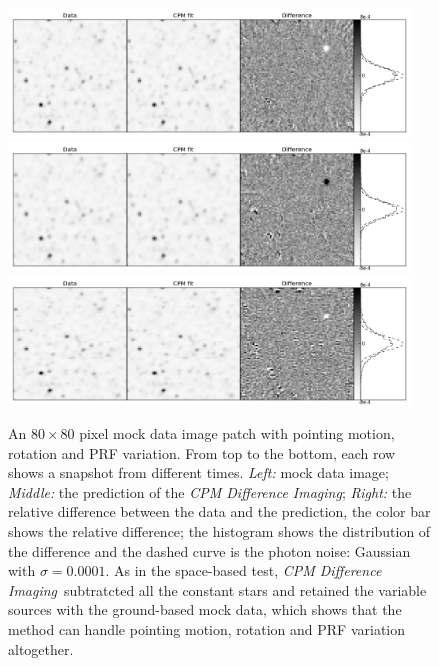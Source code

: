 \documentclass[12pt, preprint]{aastex}
\newcommand{\project}[1]{\textsl{#1}}
\newcommand{\cpmdiff}{\project{CPM Difference Imaging}}
\begin{document}
\begin{figure}[p]
\begin{center}
\includegraphics[width=0.95\textwidth]{f3a}
\includegraphics[width=0.95\textwidth]{f3b}
\includegraphics[width=0.95\textwidth]{f3c}
\end{center}
\caption{
  \label{ground}
  An $80\times 80$ pixel mock data image patch with pointing motion, rotation and PRF variation. 
  From top to the bottom,  each row shows a snapshot from different times.
  \emph{Left:} mock data image;
  \emph{Middle:} the prediction of the \cpmdiff;
  \emph{Right:} the relative difference between the data and the prediction, the color bar shows the relative difference; 
  the histogram shows the distribution of the difference and the dashed curve is the photon noise: Gaussian with $\sigma = 0.0001$. 
  As in the space-based test, \cpmdiff\ subtratcted all the constant stars and retained the variable sources with the ground-based mock data, which shows that the method can handle pointing motion, rotation and PRF variation altogether. 
}
\end{figure}
\end{document}
